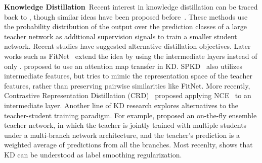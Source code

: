 \documentclass[final]{cvpr}
\theoremstyle{definition}
\begin{document}
\noindent\textbf{Knowledge Distillation}\,
Recent interest in knowledge distillation can be traced back to \cite{hinton2015distilling}, though similar ideas have been proposed before~\cite{zeng2000using, bucilua2006model}. 
These methods use the probability distribution of the output over the prediction classes of a large teacher network as additional supervision signals to train a smaller student network. 
Recent studies have suggested alternative distillation objectives.
Later works such as FitNet~\cite{romero2014fitnets} extend the idea by using the intermediate layers instead of only . \cite{zagoruyko2016paying} proposed to use an attention map transfer in KD. SPKD~\cite{tung2019similarity} also utilizes intermediate features, but tries to mimic the representation space of the teacher features, rather than preserving pairwise similarities like FitNet.
More recently, Contrastive Representation Distillation (CRD)~\cite{tian2019contrastive} proposed applying NCE~\cite{gutmann2010noise} to an intermediate layer.
Another line of KD research explores alternatives to the teacher-student training paradigm. For example,
\cite{zhu2018knowledge} proposed an on-the-fly ensemble teacher network, in which the teacher is jointly trained with multiple students under a multi-branch network architecture, and the teacher's prediction is a weighted average of predictions from all the branches. Most recenlty, \cite{yuan2020revisiting} shows that KD can be understood as label smoothing regularization. 
\end{document}
